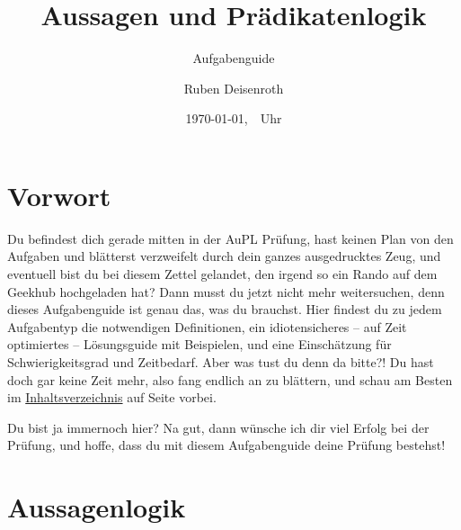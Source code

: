 \documentclass[
    ngerman,
    color=3b,
    summary,
    boxarc,
    main,
    fleqn,
    leqno,
]{rubos-tuda-template}
\title[AuPL]{Aussagen und Prädikatenlogik}
\subtitle{Aufgabenguide}
\author{Ruben Deisenroth}
\date{\today,~\currenttime~Uhr}
\newcommand*\cleartoleftpage{%
    \clearpage
    \ifodd\value{page}\hbox{}\newpage\fi
}
\begin{document}
    \label{toc}\maketitle{}
    \section{Vorwort}
    Du befindest dich gerade mitten in der AuPL Prüfung, hast keinen Plan von den Aufgaben und blätterst verzweifelt durch dein ganzes ausgedrucktes Zeug, und eventuell bist du bei diesem Zettel gelandet, den irgend so ein Rando auf dem Geekhub hochgeladen hat? Dann musst du jetzt nicht mehr weitersuchen, denn dieses Aufgabenguide ist genau das, was du brauchst. Hier findest du zu jedem Aufgabentyp die notwendigen Definitionen, ein idiotensicheres -- auf Zeit optimiertes -- Lösungsguide mit Beispielen, und eine Einschätzung für Schwierigkeitsgrad und Zeitbedarf. Aber was tust du denn da bitte?! Du hast doch gar keine Zeit mehr, also fang endlich an zu blättern, und schau am Besten im \hyperref[toc]{Inhaltsverzeichnis} auf Seite \pageref{toc} vorbei.

    Du bist ja immernoch hier? Na gut, dann wünsche ich dir viel Erfolg bei der Prüfung, und hoffe, dass du mit diesem Aufgabenguide deine Prüfung bestehst!
    \tableofcontents %



    \vspace{\fill}
    \mbox{}
    \cleartoleftpage{}
    \section{Aussagenlogik}
\end{document}
